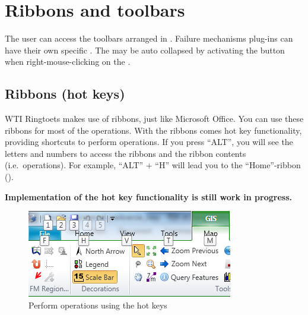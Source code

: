 
\section{Ribbons and toolbars}
\label{sec:ribbons}
The user can access the toolbars arranged in . Failure mechanisms plug-ins can have their own specific . The  may be auto collapsed by activating the  button when right-mouse-clicking on the .

\subsection{Ribbons (hot keys)}\label{subsec:gettingstarted_ribons}

WTI Ringtoets makes use of ribbons, just like Microsoft Office. You can use these ribbons for most of the operations. 
With the ribbons comes hot key functionality, providing shortcuts to perform operations.
If you press ``ALT'', you will see the letters and numbers to access the ribbons and the ribbon contents (i.e.\ operations). For example, ``ALT'' + ``H'' will lead you to the ``Home''-ribbon ().

\textbf{\Note Implementation of the hot key functionality is still work in progress.}

\begin{figure}[H]
	\centering
	\includegraphics{Figures/Chapter_overview/ds_ribbon_hotkey.png}
	\caption{Perform operations using the hot keys} \label{fig:ribbonhotkey}
\end{figure}

